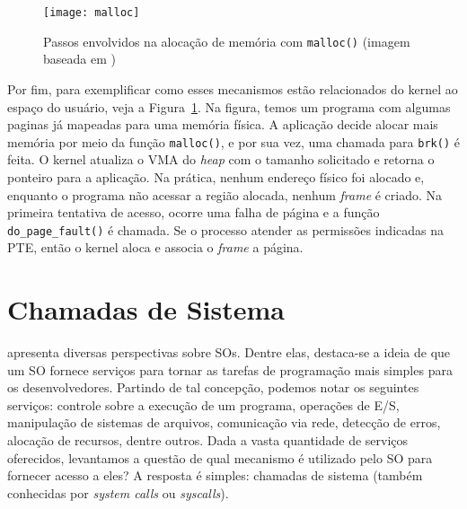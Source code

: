 %

\begin{figure}[!h]
  \centering
  \texttt{[image: malloc]}
  \caption{Passos envolvidos na alocação de memória com \texttt{malloc()} (imagem baseada em \cite{anatomy_program_mem})}
  \label{fig:malloc_linux}
\end{figure}

Por fim, para exemplificar como esses mecanismos estão relacionados do kernel ao
espaço do usuário, veja a Figura~\ref{fig:malloc_linux}. Na figura, temos um programa com
algumas paginas já mapeadas para uma memória física. A aplicação decide alocar
mais memória por meio da função \texttt{malloc()}, e por sua vez, uma chamada
para \texttt{brk()} é feita. O kernel atualiza o VMA do \textit{heap} com o
tamanho solicitado e retorna o ponteiro para a aplicação. Na prática, nenhum
endereço físico foi alocado e, enquanto o programa não acessar a região alocada,
nenhum \emph{frame} é criado. Na primeira tentativa de acesso, ocorre uma falha
de página e a função \texttt{do\_page\_fault()} é chamada. Se o processo
atender as permissões indicadas na PTE, então o kernel aloca e associa o
\emph{frame} a página.

\section{Chamadas de Sistema}

\citet{silberschatz} apresenta diversas perspectivas sobre SOs. Dentre elas,
destaca-se a ideia de que um SO fornece serviços para tornar as tarefas de
programação mais simples para os desenvolvedores. Partindo de tal concepção,
podemos notar os seguintes serviços: controle sobre a execução de um programa,
operações de E/S, manipulação de sistemas de arquivos, comunicação via rede,
detecção de erros, alocação de recursos, dentre outros. Dada a vasta quantidade
de serviços oferecidos, levantamos a questão de qual mecanismo é utilizado pelo
SO para fornecer acesso a eles? A resposta é simples: chamadas de
sistema (também conhecidas por \emph{system calls} ou \emph{syscalls}).

